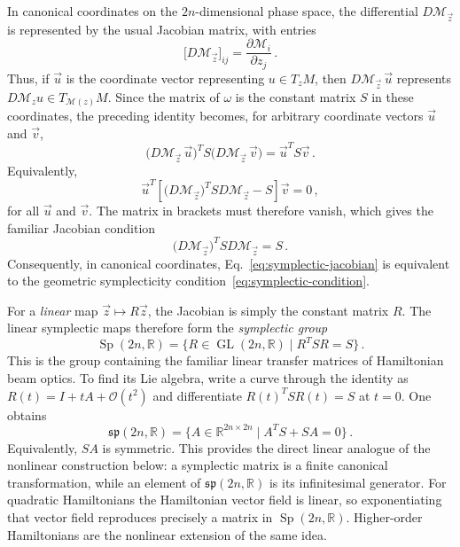 In canonical coordinates on the $2n$-dimensional phase space, the
differential $D\mathcal M_{\vec z}$ is represented by the usual Jacobian
matrix, with entries
\begin{equation}
    \bigl[D\mathcal M_{\vec z}\bigr]_{ij}
    = \frac{\partial \mathcal M_i}{\partial z_j}\,.
\end{equation}
Thus, if $\vec u$ is the coordinate vector representing $u\in T_zM$, then
$D\mathcal M_{\vec z}\,\vec u$ represents
$D\mathcal M_z u\in T_{\mathcal M(z)}M$. Since the matrix of $\omega$ is
the constant matrix $S$ in these coordinates, the preceding identity becomes,
for arbitrary coordinate vectors $\vec u$ and $\vec v$,
\begin{equation}
    \bigl(D\mathcal M_{\vec z}\,\vec u\bigr)^T S
    \bigl(D\mathcal M_{\vec z}\,\vec v\bigr)
    = \vec u^T S\vec v\,.
\end{equation}
Equivalently,
\begin{equation}
    \vec u^T\left[
        \bigl(D\mathcal M_{\vec z}\bigr)^T S D\mathcal M_{\vec z} - S
    \right]\vec v = 0\,,
\end{equation}
for all $\vec u$ and $\vec v$.  The matrix in brackets must therefore
vanish, which gives the familiar Jacobian condition
\begin{equation}\label{eq:symplectic-jacobian}
    \bigl(D\mathcal M_{\vec z}\bigr)^T S D\mathcal M_{\vec z} = S\,.
\end{equation}
Consequently, in canonical coordinates,
Eq.~\eqref{eq:symplectic-jacobian} is equivalent to the geometric
symplecticity condition~\eqref{eq:symplectic-condition}.

For a \emph{linear} map $\vec z\mapsto R\vec z$, the Jacobian is simply the
constant matrix $R$.  The linear symplectic maps therefore form the
\emph{symplectic group}
\begin{equation}
    \operatorname{Sp}(2n,\mathbb R) = \{R\in\operatorname{GL}(2n,\mathbb R)
    \mid R^T S R = S\}\,.
\end{equation}
This is the group containing the familiar linear transfer matrices of
Hamiltonian beam optics.  To find its Lie algebra, write a curve through the
identity as $R(t) = I + tA + \mathcal O(t^2)$ and differentiate
$R(t)^TSR(t) = S$ at $t = 0$.  One obtains
\begin{equation}\label{eq:symplectic-lie-algebra}
    \mathfrak{sp}(2n,\mathbb R) = \{A\in\mathbb R^{2n\times2n}
    \mid A^TS + SA = 0\}\,.
\end{equation}
Equivalently, $SA$ is symmetric.  This provides the direct linear analogue of
the nonlinear construction below: a symplectic matrix is a finite canonical
transformation, while an element of $\mathfrak{sp}(2n,\mathbb R)$ is its
infinitesimal generator.  For quadratic Hamiltonians the Hamiltonian vector
field is linear, so exponentiating that vector field reproduces precisely a
matrix in $\operatorname{Sp}(2n,\mathbb R)$.  Higher-order Hamiltonians are
the nonlinear extension of the same idea.



